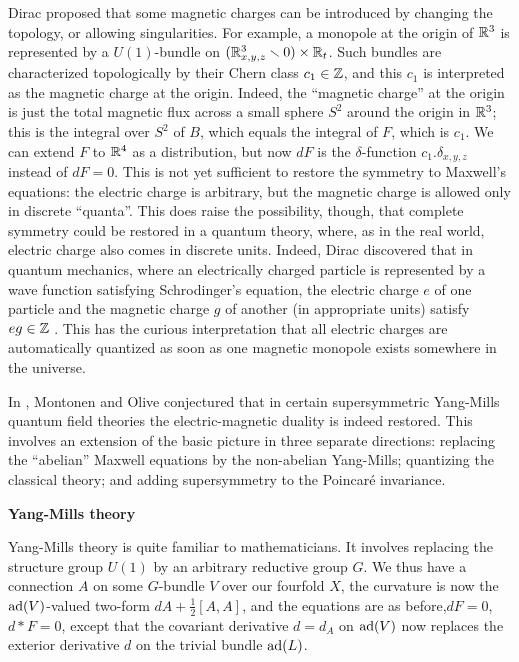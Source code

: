Dirac proposed that some magnetic charges can be introduced
by changing the topology, or allowing singularities.
For example, a monopole at the origin of ${\Bbb R}^3$ is
represented by a $U(1)$-bundle on
$({\Bbb R}_{x,y,z}^3\smallsetminus 0)\times{\Bbb R}_t$.
Such bundles are characterized topologically by their Chern
class $c_1\in{\Bbb Z}$, and this $c_1$ is interpreted as the 
magnetic charge at the origin. Indeed, the ``magnetic charge'' 
at the origin is just the total 
magnetic flux across a small sphere $S^2$ around the origin in 
${\Bbb R}^3$; this is the integral over $S^2$ of $B$, which equals 
the integral of $F$, which is $c_1$. 
We can extend $F$  to ${\Bbb R}^4$ as a distribution, but now 
$dF$ is the
$\delta$-function $c_1.\delta_{x,y,z}$ instead of $dF=0$.
This is not yet sufficient to restore the symmetry to
Maxwell's equations: the electric charge is arbitrary, but
the magnetic charge is allowed only in discrete ``quanta''.
This does raise the possibility, though, that complete
symmetry could be restored in a quantum theory, where, 
as in the real world,
electric charge also comes in discrete units.
Indeed, Dirac discovered that in quantum mechanics, where 
an electrically charged particle is represented by a wave 
function satisfying Schrodinger's equation, the electric charge 
$e$ of one particle and the magnetic charge $g$ of another 
(in appropriate units) satisfy $e g \in {\Bbb Z}$ . This has the 
curious interpretation that all electric 
charges are automatically quantized as soon as one magnetic 
monopole exists somewhere in the universe.

In \cite{MO}, Montonen and Olive conjectured that in certain
supersymmetric Yang-Mills quantum field theories the
electric-magnetic duality is indeed restored.
This involves an extension of the basic picture in three
separate directions: replacing the ``abelian'' Maxwell
equations by the non-abelian Yang-Mills; quantizing the
classical theory; and adding supersymmetry to the Poincar\'e
invariance.

\medskip\noindent
{\bf Yang-Mills theory}

Yang-Mills theory is quite familiar to mathematicians.
It involves replacing the structure group $U(1)$ by an
arbitrary reductive group $G$.
We thus have a connection $A$ on some $G$-bundle $V$ over
our fourfold $X$, the curvature is now the $\text{\rm ad}(V)$-valued
two-form $dA+\frac{1}{2} [A,A]$, and the equations are as 
before,$dF=0$, $d*F=0$,
except that the covariant derivative $d=d_A$ on 
$\text{\rm ad}(V)$ now replaces the
exterior derivative $d$ on the trivial bundle $\text{\rm ad}(L)$.

